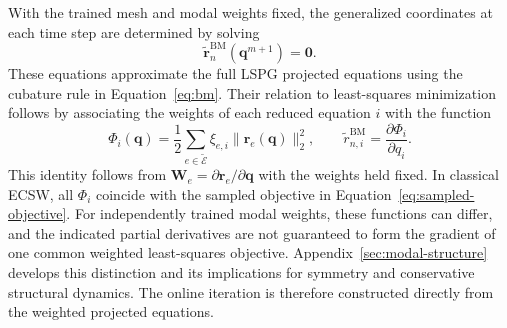 \documentclass[a4paper,12pt]{article}
\newcommand{\vect}[1]{\boldsymbol{#1}}
\newcommand{\matr}[1]{\boldsymbol{#1}}
\begin{document}
With the trained mesh and modal weights fixed, the generalized coordinates at each time step are determined by solving
\begin{equation}
 \widetilde{\vect{r}}_n^{\mathrm{BM}}(\vect{q}^{m+1})=\vect{0}.
 \label{eq:bm-root}
\end{equation}
These equations approximate the full LSPG projected equations using the cubature rule in Equation~\eqref{eq:bm}. Their relation to least-squares minimization follows by associating the weights of each reduced equation $i$ with the function
\begin{equation}
 \Phi_i(\vect{q})=\frac12\sum_{e\in\widetilde{\mathcal E}}
                    \xi_{e,i}\|\vect{r}_e(\vect{q})\|_2^2,
 \qquad
 \widetilde r_{n,i}^{\mathrm{BM}}
 =\frac{\partial\Phi_i}{\partial q_i}.
 \label{eq:bm-modal-objective}
\end{equation}
This identity follows from $\matr{W}_e=\partial\vect{r}_e/\partial\vect{q}$ with the weights held fixed. In classical ECSW, all $\Phi_i$ coincide with the sampled objective in Equation~\eqref{eq:sampled-objective}. For independently trained modal weights, these functions can differ, and the indicated partial derivatives are not guaranteed to form the gradient of one common weighted least-squares objective. Appendix~\ref{sec:modal-structure} develops this distinction and its implications for symmetry and conservative structural dynamics. The online iteration is therefore constructed directly from the weighted projected equations.
\end{document}
